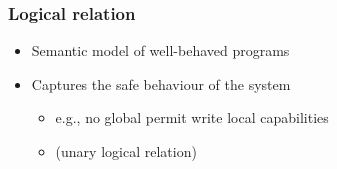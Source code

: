 \documentclass[handout]{beamer}
\begin{document}
\begin{comment}
\begin{frame}
  \frametitle{Examples}
  \begin{itemize}
  \item Ticket dispenser
    \begin{itemize}
    \item Compartmentalisation
    \item Local state encapsulated
    \item enter capability
    \end{itemize}
  \item ``Awkward'' %
    \begin{itemize}
    \item Well-bracketedness
    \item Stack as local capability
      \begin{itemize}
      \item Execute code on stack
      \end{itemize}
    \item Return pointer as local
    \item Global call-back
    \end{itemize}
  \end{itemize}
\end{frame}
\end{comment}


\begin{frame}
  \frametitle{Logical relation}
  \begin{itemize}
  \item Semantic model of well-behaved programs 
  \item Captures the safe behaviour of the system
    \begin{itemize}
    \item e.g., no global permit write local capabilities
    \item (unary logical relation)
    \end{itemize}
  \end{itemize}
\end{frame}
\end{document}
